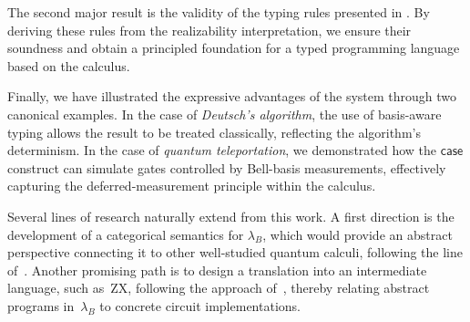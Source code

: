 \documentclass[runningheads,orivec,envcountsame,envcountsect]{llncs}
\newcommand{\lambdaB}{\lambda_B}
\begin{document}
The second major result is the validity of the typing rules presented in
.  
By deriving these rules from the realizability interpretation, we ensure their
soundness and obtain a principled foundation for a typed programming language
based on the calculus.

Finally, we have illustrated the expressive advantages of the system through two
canonical examples.  
In the case of \emph{Deutsch's algorithm}, the use of basis-aware typing allows
the result to be treated classically, reflecting the algorithm's determinism.  
In the case of \emph{quantum teleportation}, we demonstrated how the
$\mathsf{case}$ construct can simulate gates controlled by Bell-basis
measurements, effectively capturing the deferred-measurement principle within
the calculus.

Several lines of research naturally extend from this work.  
A first direction is the development of a categorical semantics for $\lambdaB$,
which would provide an abstract perspective connecting it to other well-studied
quantum calculi, following the line of~\cite{DiazcaroCIE2025}.  
Another promising path is to design a translation into an intermediate language,
such as~ZX, following the approach of~\cite{BorgnaRomeroQPL22}, thereby relating
abstract programs in~$\lambdaB$ to concrete circuit implementations.

%
%
%
%



\clearpage

\makeatletter
\renewcommand*\theHsection{\thesection}
\makeatother
\appendix
\end{document}
